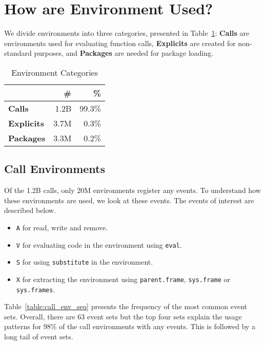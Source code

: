 \documentclass[10pt,review,sigplan,authorversion=true]{acmart}
\newcommand{\code}[1]{\lstinline |#1|\xspace}
\newcommand{\eval}{\code{eval}}
\newcommand{\substitute}{\code{substitute}}
\begin{document}
\section{How are Environment Used?}

We divide environments into three categories, presented in
Table~\ref{table:env_category}: \textbf{Calls} are environments used for
evaluating function calls, \textbf{Explicits} are created for non-standard
purposes, and \textbf{Packages} are needed for package loading.

\begin{table}[!h]
  \vspace{-3mm} \small
  \caption{Environment Categories} \label{table:env_category}
  \centering
  \begin{tabular}{lrr}    \toprule
    &\textbf{\#}&\textbf{\%}\\
    \midrule
    \textbf{Calls}&1.2B&99.3\%\\
    \textbf{Explicits}&3.7M&0.3\%\\
    \textbf{Packages}&3.3M&0.2\%\\ \bottomrule
  \end{tabular}
\end{table}


\subsection{Call Environments}

Of the 1.2B calls, only 20M environments register any events. To understand how
these environments are used, we look at these events. The events of interest are
described below.
\begin{itemize}
\item \texttt{A} for read, write and remove.
\item \texttt{V} for evaluating code in the environment using  \eval.
\item \texttt{S} for using \substitute in the environment.
\item \texttt{X} for extracting the environment using \code{parent.frame},
  \code{sys.frame} or \code{sys.frames}.
\end{itemize}

Table~\ref{table:call_env_seq} presents the frequency of the most common event
sets. Overall, there are 63 event sets but the top four sets explain the usage
patterns for 98\% of the call environments with any events. This is followed
by a long tail of event sets.
\end{document}
